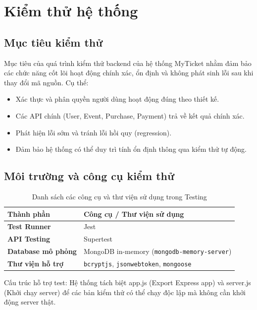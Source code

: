 \section{Kiểm thử hệ thống}

\subsection{Mục tiêu kiểm thử}

Mục tiêu của quá trình kiểm thử backend của hệ thống MyTicket nhằm đảm bảo các chức năng cốt lõi hoạt động chính xác, ổn định và không phát sinh lỗi sau khi thay đổi mã nguồn. Cụ thể:
\begin{itemize}
    \item[-] Xác thực và phân quyền người dùng hoạt động đúng theo thiết kế.
    \item[-] Các API chính (User, Event, Purchase, Payment) trả về kết quả chính xác.
    \item[-] Phát hiện lỗi sớm và tránh lỗi hồi quy (regression).
    \item[-] Đảm bảo hệ thống có thể duy trì tính ổn định thông qua kiểm thử tự động.
\end{itemize}

\subsection{Môi trường và công cụ kiểm thử}
\setlength{\LTleft}{0pt}
\setlength{\LTright}{0pt}
\begin{longtable}{@{} >{\bfseries}p{} p{} @{}}
\caption{Danh sách các công cụ và thư viện sử dụng trong Testing}\label{tab:testing-tools}\\[15pt]
\toprule
\textnormal{\textbf{Thành phần}} & \textbf{Công cụ / Thư viện sử dụng} \\ \midrule
Test Runner        & Jest \\ \addlinespace
API Testing        & Supertest \\ \addlinespace
Database mô phỏng  & MongoDB in-memory (\texttt{mongodb-memory-server}) \\ \addlinespace
Thư viện hỗ trợ    & \texttt{bcryptjs}, \texttt{jsonwebtoken}, \texttt{mongoose} \\ \bottomrule
\end{longtable}

Cấu trúc hỗ trợ test: Hệ thống tách biệt app.js (Export Express app) và server.js (Khởi chạy server) để các bản kiểm thử có thể chạy độc lập mà không cần khởi động server thật.

